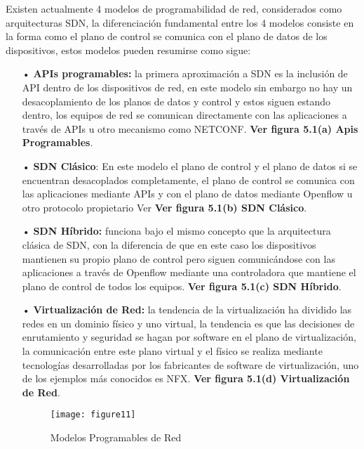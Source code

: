 Existen actualmente 4 modelos de programabilidad de red, considerados como arquitecturas SDN, la diferenciación fundamental entre los 4 modelos consiste en la forma como el plano de control se comunica con el plano de datos de los dispositivos, estos modelos pueden resumirse como sigue:
\begin{itemize}
\item[•] \textbf{APIs programables:}  la primera aproximación a SDN es la inclusión de API dentro de los dispositivos de red, en este modelo sin embargo no hay un desacoplamiento de los planos de datos y control y estos siguen estando dentro, los equipos de red se comunican directamente con las aplicaciones a través de APIs u otro mecanismo como NETCONF. \textbf{Ver figura 5.1(a) Apis Programables}.

\item[•] \textbf{SDN Clásico}: En este modelo el plano de control y el plano de datos si se encuentran desacoplados completamente, el plano de control se comunica con las aplicaciones mediante APIs y con el plano de datos mediante Openflow u otro protocolo propietario Ver \textbf{Ver figura 5.1(b) SDN Clásico}.

\item[•] \textbf{SDN Híbrido:} funciona bajo el mismo concepto que la arquitectura clásica de SDN, con la diferencia de que en este caso los dispositivos mantienen su propio plano de control pero siguen comunicándose con las aplicaciones a través de Openflow mediante una controladora que mantiene el plano de control de todos los equipos. \textbf{Ver figura 5.1(c) SDN Híbrido}.

\item[•]\textbf{Virtualización de Red:} la tendencia de la virtualización ha dividido las redes en un dominio físico y uno virtual, la tendencia es que las decisiones de enrutamiento y seguridad se hagan por software en el plano de virtualización, la comunicación entre este plano virtual y el físico se realiza mediante tecnologías desarrolladas por los fabricantes de software de virtualización, uno de los ejemplos más conocidos es NFX. \textbf{Ver figura 5.1(d) Virtualización de Red}.

\begin{figure}[htbp]
  \centering
    {\texttt{[image: figure11]}}%
  \caption{Modelos Programables de Red}
  \label{fig:fig2subfig}
\end{figure}

\end{itemize}
